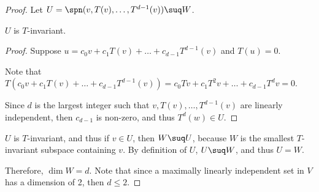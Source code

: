 \documentclass[11pt]{scrartcl}
\begin{document}
\begin{enumerate}[label=\alph*)]
\begin{proof}
    Let $U = \spn(v, T(v), \dots, T^{d-1}(v))\suq W$.

    \begin{lemma*}
      $U$ is $T$-invariant.
    \end{lemma*}

    \begin{proof}
      \hfill

      Suppose $u = c_0v + c_1T(v)+\dots+c_{d-1}T^{d-1}(v)$ and
      $T(u) = 0$.

      Note that
      $T(c_0v + c_1T(v)+\dots+c_{d-1}T^{d-1}(v)) = c_0Tv + c_1T^2v
      +\dots + c_{d-1}T^dv = 0$.

      Since $d$ is the largest integer such that
      $v, T(v), \dots, T^{d-1}(v)$ are linearly independent, then
      $c_{d-1}$ is non-zero, and thus $T^d(w) \in U$.
    \end{proof}

    $U$ is $T$-invariant, and thus if $v\in U$, then $W\suq U$, because
    $W$ is the smallest $T$-invariant subspace containing $v$. By
    definition of $U$, $U \suq W$, and thus $U = W$.

    Therefore, $\dim W = d$. Note that since a maximally linearly
    independent set in $V$ has a dimension of 2, then $d\leq 2$.
  \end{proof}
\end{enumerate}
\end{document}
